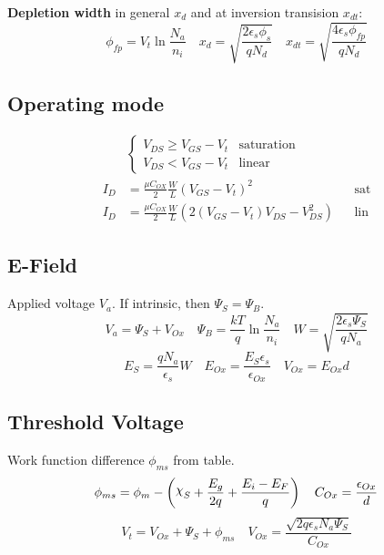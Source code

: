 \documentclass[a4paper, fontsize=8pt, landscape, DIV=1]{scrartcl}
\begin{document}
\begin{multicols*}{4}
    \textbf{Depletion width} in general $x_d$ and at inversion transision $x_{dt}$:
    \[\phi_{fp} = V_t\ln\frac{N_a}{n_i} \quad x_d = \sqrt{\frac{2\epsilon_s\phi_s}{qN_d}} \quad x_{dt} = \sqrt{\frac{4\epsilon_s\phi_{fp}}{qN_d}}\]
    
    \subsection{Operating mode}
    \begin{align*}
      &\begin{cases}
        V_{DS} \geq V_{GS} - V_t & \text{saturation} \\
        V_{DS}  <   V_{GS} - V_t & \text{linear}
      \end{cases} \\
      I_{D} &= \frac{\mu C_{OX}}{2}\frac{W}{L} (V_{GS} - V_t) ^2 && \text{sat} \\
      I_{D} &= \frac{\mu C_{OX}}{2}\frac{W}{L} \left( 2(V_{GS} - V_t) V_{DS} - V_{DS}^2 \right) && \text{lin} 
    \end{align*}

    \subsection{E-Field}
    Applied voltage $V_a$. If intrinsic, then $\Psi_S = \Psi_B$.
    \[ V_a = \Psi_S + V_{Ox} \quad \Psi_B = \frac{kT}{q}\ln\frac{N_a}{n_i} \quad W=\sqrt{\frac{2\epsilon_s\Psi_S}{qN_a}}\]
    \[ E_S = \frac{qN_a}{\epsilon_s}W \quad E_{Ox}=\frac{E_S\epsilon_s}{\epsilon_{Ox}} \quad V_{Ox} = E_{Ox}d \]

    \subsection{Threshold Voltage}
    Work function difference $\phi_{ms}$ from table.
    \[ \phi_{ms} = \phi_m - \left(\altchi_S + \frac{E_g}{2q} + \frac{E_i-E_F}{q}\right)  \quad C_{Ox} = \frac{\epsilon_{Ox}}{d} \]
    \[ V_t = V_{Ox} + \Psi_S + \phi_{ms} \quad V_{Ox} = \frac{\sqrt{2q\epsilon_s N_a \Psi_S}}{C_{Ox}} \]




\end{multicols*}

\setcounter{secnumdepth}{2}
\end{document}
